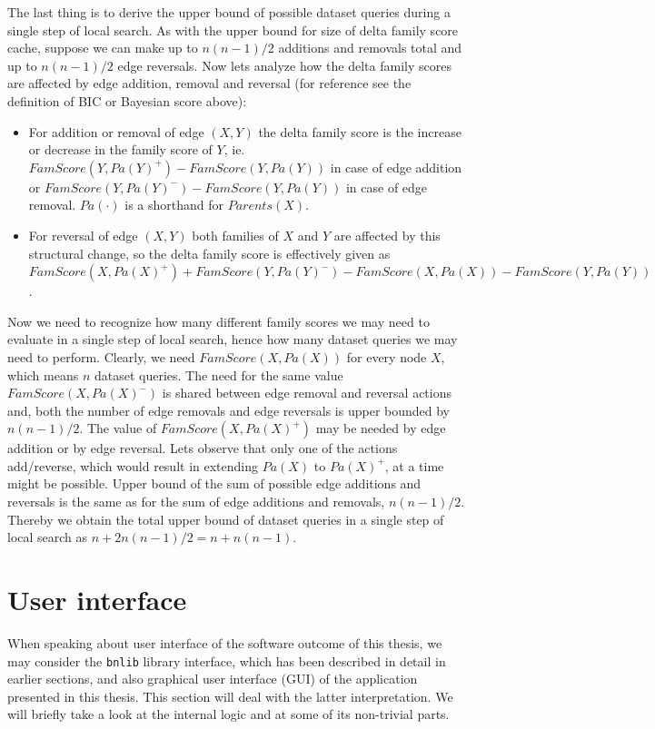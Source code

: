 \documentclass[english,cover]{fitthesis} %
\newcommand{\srccode}[1]{{\tt #1}}         %
\begin{document}
\medskip
The last thing is to derive the upper bound of possible dataset queries during a single step of local search. As with the upper bound for size of delta family score cache, suppose we can make up to $n(n-1)/2$ additions and removals total and up to $n(n-1)/2$ edge reversals. Now lets analyze how the delta family scores are affected by edge addition, removal and reversal (for reference see the definition of BIC or Bayesian score above):
\begin{itemize}
	\item For addition or removal of edge $(X,Y)$ the delta family score is the increase or decrease in the family score of $Y$, ie. $FamScore(Y,Pa(Y)^{+}) - FamScore(Y,Pa(Y))$ in case of edge addition or $FamScore(Y,Pa(Y)^{-}) - FamScore(Y,Pa(Y))$ in case of edge removal. $Pa(\cdot)$ is a shorthand for $Parents(X)$.
	\item For reversal of edge $(X,Y)$ both families of $X$ and $Y$ are affected by this structural change, so the delta family score is effectively given as $FamScore(X,Pa(X)^+) + FamScore(Y,Pa(Y)^-) - FamScore(X,Pa(X)) - FamScore(Y,Pa(Y))$.
\end{itemize}
Now we need to recognize how many different family scores we may need to evaluate in a single step of local search, hence how many dataset queries we may need to perform.
Clearly, we need $FamScore(X,Pa(X))$ for every node $X$, which means $n$ dataset queries.
The need for the same value $FamScore(X,Pa(X)^-)$ is shared between edge removal and reversal actions and, both the number of edge removals and edge reversals is upper bounded by $n(n-1)/2$.
The value of $FamScore(X,Pa(X)^+)$ may be needed by edge addition or by edge reversal. Lets observe that only one of the actions add/reverse, which would result in extending $Pa(X)$ to $Pa(X)^+$, at a time might be possible. Upper bound of the sum of possible edge additions and reversals is the same as for the sum of edge additions and removals, $n(n-1)/2$. Thereby we obtain the total upper bound of dataset queries in a single step of local search as $n + 2n(n-1)/2 = n + n(n-1)$.




\section{User interface}
When speaking about user interface of the software outcome of this thesis, we may consider the \srccode{bnlib} library interface, which has been described in detail in earlier sections, and also graphical user interface (GUI) of the application presented in this thesis. This section will deal with the latter interpretation. We will briefly take a look at the internal logic and at some of its non-trivial parts.
\end{document}
